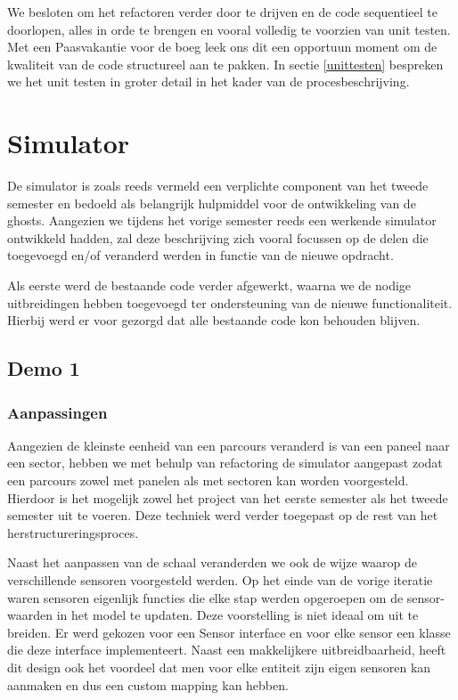 \documentclass[12pt,a4paper]{report}
\begin{document}
We besloten om het refactoren verder door te drijven en de code sequentieel te doorlopen, alles in orde te brengen en vooral volledig te voorzien van unit testen. Met een Paasvakantie voor de boeg leek ons dit een opportuun moment om de kwaliteit van de code structureel aan te pakken.
In sectie \ref{unittesten} bespreken we het unit testen in groter detail in het kader van de procesbeschrijving.

\chapter{Simulator}

De simulator is zoals reeds vermeld een verplichte component van het tweede semester en bedoeld als belangrijk hulpmiddel voor de ontwikkeling van de ghosts. Aangezien we tijdens het vorige semester reeds een werkende simulator ontwikkeld hadden, zal deze beschrijving zich vooral focussen op de delen die toegevoegd en/of veranderd werden in functie van de nieuwe opdracht.

Als eerste werd de bestaande code verder afgewerkt, waarna we de nodige uitbreidingen hebben toegevoegd ter ondersteuning van de nieuwe functionaliteit. Hierbij werd er voor gezorgd dat alle bestaande code kon behouden blijven.

\section{Demo 1}

\subsection{Aanpassingen}

Aangezien de kleinste eenheid van een parcours veranderd is van een paneel naar een sector, hebben we met behulp van refactoring de simulator aangepast zodat een parcours zowel met panelen als met sectoren kan worden voorgesteld. Hierdoor is het mogelijk zowel het project van het eerste semester als het tweede semester uit te voeren. Deze techniek werd verder toegepast op de rest van het herstructureringsproces. 

Naast het aanpassen van de schaal veranderden we ook de wijze waarop de verschillende sensoren voorgesteld werden. Op het einde van de vorige iteratie waren sensoren eigenlijk functies die elke stap werden opgeroepen om de sensor-waarden in het model te updaten. Deze voorstelling is niet ideaal om uit te breiden. Er werd gekozen voor een Sensor interface en voor elke sensor een klasse die deze interface implementeert. Naast een makkelijkere uitbreidbaarheid, heeft dit design ook het voordeel dat men voor elke entiteit zijn eigen sensoren kan aanmaken en dus een custom mapping kan hebben.
\end{document}
